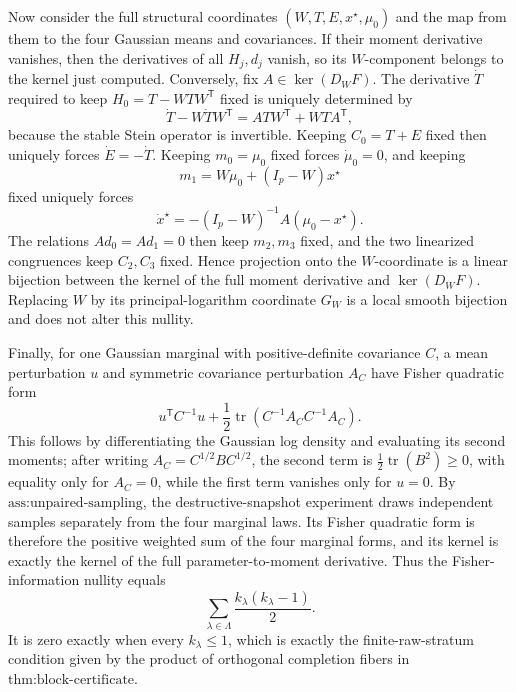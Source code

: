 Now consider the full structural coordinates \((W,T,E,x^\star,\mu_0)\) and the map from them to the four Gaussian means and covariances.  If their moment derivative vanishes, then the derivatives of all \(H_j,d_j\) vanish, so its \(W\)-component belongs to the kernel just computed.  Conversely, fix \(A\in\ker(D_WF)\).  The derivative \(\dot T\) required to keep \(H_0=T-WTW^{\mathsf T}\) fixed is uniquely determined by
\[
 \dot T-W\dot TW^{\mathsf T}=ATW^{\mathsf T}+WTA^{\mathsf T},
\]
because the stable Stein operator is invertible.  Keeping \(C_0=T+E\) fixed then uniquely forces \(\dot E=-\dot T\).  Keeping \(m_0=\mu_0\) fixed forces \(\dot\mu_0=0\), and keeping
\[
 m_1=W\mu_0+(I_p-W)x^\star
\]
fixed uniquely forces
\[
 \dot x^\star=-(I_p-W)^{-1}A(\mu_0-x^\star).
\]
The relations \(Ad_0=Ad_1=0\) then keep \(m_2,m_3\) fixed, and the two linearized congruences keep \(C_2,C_3\) fixed.  Hence projection onto the \(W\)-coordinate is a linear bijection between the kernel of the full moment derivative and \(\ker(D_WF)\).  Replacing \(W\) by its principal-logarithm coordinate \(G_W\) is a local smooth bijection and does not alter this nullity.

Finally, for one Gaussian marginal with positive-definite covariance \(C\), a mean perturbation \(u\) and symmetric covariance perturbation \(A_C\) have Fisher quadratic form
\[
 u^{\mathsf T}C^{-1}u+
 \frac12\operatorname{tr}(C^{-1}A_CC^{-1}A_C).
\]
This follows by differentiating the Gaussian log density and evaluating its second moments; after writing \(A_C=C^{1/2}BC^{1/2}\), the second term is \(\frac12\operatorname{tr}(B^2)\geq0\), with equality only for \(A_C=0\), while the first term vanishes only for \(u=0\).  By \(\text{ass:unpaired-sampling}\), the destructive-snapshot experiment draws independent samples separately from the four marginal laws.  Its Fisher quadratic form is therefore the positive weighted sum of the four marginal forms, and its kernel is exactly the kernel of the full parameter-to-moment derivative.  Thus the Fisher-information nullity equals
\[
 \sum_{\lambda\in\Lambda}\frac{k_\lambda(k_\lambda-1)}2.
\]
It is zero exactly when every \(k_\lambda\leq1\), which is exactly the finite-raw-stratum condition given by the product of orthogonal completion fibers in \(\text{thm:block-certificate}\).
